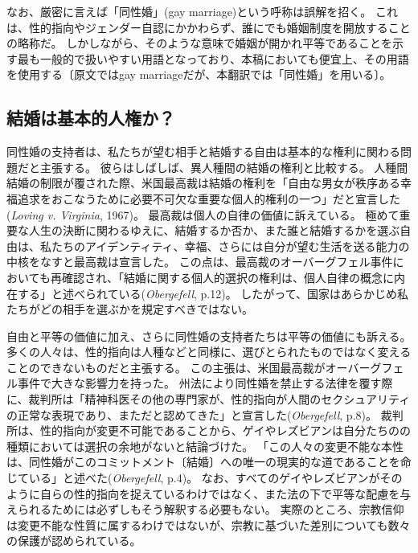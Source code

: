 \documentclass[paper=a4,book,openany]{jlreq}
\begin{document}
なお、厳密に言えば「同性婚」(gay marriage)という呼称は誤解を招く。
これは、性的指向やジェンダー自認にかかわらず、誰にでも婚姻制度を開放することの略称だ。
しかしながら、そのような意味で婚姻が開かれ平等であることを示す最も一般的で扱いやすい用語となっており、本稿においても便宜上、その用語を使用する〔原文ではgay marriageだが、本翻訳では「同性婚」を用いる〕。

\subsection{結婚は基本的人権か？}

同性婚の支持者は、私たちが望む相手と結婚する自由は基本的な権利に関わる問題だと主張する。
彼らはしばしば、異人種間の結婚の権利と比較する。
人種間結婚の制限が覆された際、米国最高裁は結婚の権利を「自由な男女が秩序ある幸福追求をおこなうために必要不可欠な重要な個人的権利の一つ」だと宣言した(\emph{Loving v. Virginia}, 1967)。
最高裁は個人の自律の価値に訴えている。
極めて重要な人生の決断に関わるゆえに、結婚するか否か、また誰と結婚するかを選ぶ自由は、私たちのアイデンティティ、幸福、さらには自分が望む生活を送る能力の中核をなすと最高裁は宣言した。
この点は、最高裁のオーバーグフェル事件においても再確認され、「結婚に関する個人的選択の権利は、個人自律の概念に内在する」と述べられている(\emph{Obergefell}, p.12)。
したがって、国家はあらかじめ私たちがどの相手を選ぶかを規定すべきではない。

自由と平等の価値に加え、さらに同性婚の支持者たちは平等の価値にも訴える。
多くの人々は、性的指向は人種などと同様に、選びとられたものではなく変えることのできないものだと主張する。
この主張は、米国最高裁がオーバーグフェル事件で大きな影響力を持った。
州法により同性婚を禁止する法律を覆す際に、裁判所は「精神科医その他の専門家が、性的指向が人間のセクシュアリティの正常な表現であり、まただと認めてきた」と宣言した(\emph{Obergefell}, p.8)。
裁判所は、性的指向が変更不可能であることから、ゲイやレズビアンは自分たちのの種類においては選択の余地がないと結論づけた。
「この人々の変更不能な本性は、同性婚がこのコミットメント〔結婚〕への唯一の現実的な道であることを命じている」と述べた(\emph{Obergefell}, p.4)。
なお、すべてのゲイやレズビアンがそのように自らの性的指向を捉えているわけではなく、また法の下で平等な配慮を与えられるためには必ずしもそう解釈する必要もない。
実際のところ、宗教信仰は変更不能な性質に属するわけではないが、宗教に基づいた差別についても数々の保護が認められている。
\end{document}
